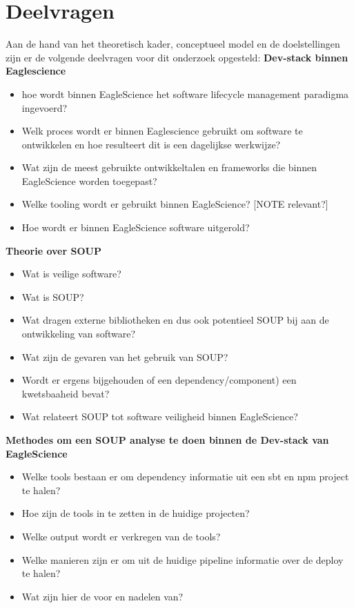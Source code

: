 \section{Deelvragen}\label{sec:deelvragen}
Aan de hand van het theoretisch kader, conceptueel model en de doelstellingen zijn er de volgende deelvragen voor dit onderzoek opgesteld:
\textbf{Dev-stack binnen Eaglescience}
\begin{itemize}
    \item hoe wordt binnen EagleScience het software lifecycle management paradigma ingevoerd?
    \item Welk proces wordt er binnen Eaglescience gebruikt om software te ontwikkelen en hoe resulteert dit is een dagelijkse werkwijze?
    \item Wat zijn de meest gebruikte ontwikkeltalen en frameworks die binnen EagleScience worden toegepast?
    \item Welke tooling wordt er gebruikt binnen EagleScience? [NOTE relevant?]
    \item Hoe wordt er binnen EagleScience software uitgerold?
\end{itemize}
\textbf{Theorie over SOUP}
\begin{itemize}
    \item Wat is veilige software?
    \item Wat is SOUP?
    \item Wat dragen externe bibliotheken en dus ook potentieel SOUP bij aan de ontwikkeling van software?
    \item Wat zijn de gevaren van het gebruik van SOUP?
    \item Wordt er ergens bijgehouden of een dependency/component) een kwetsbaaheid bevat?
    \item Wat relateert SOUP tot software veiligheid binnen EagleScience?
\end{itemize}
\textbf{Methodes om een SOUP analyse te doen binnen de Dev-stack van EagleScience}
\begin{itemize}
    \item Welke tools bestaan er om dependency informatie uit een sbt en npm project te halen?
    \item Hoe zijn de tools in te zetten in de huidige projecten?
    \item Welke output wordt er verkregen van de tools?
    \item Welke manieren zijn er om uit de huidige pipeline informatie over de deploy te halen?
    \item Wat zijn hier de voor en nadelen van?
\end{itemize}


